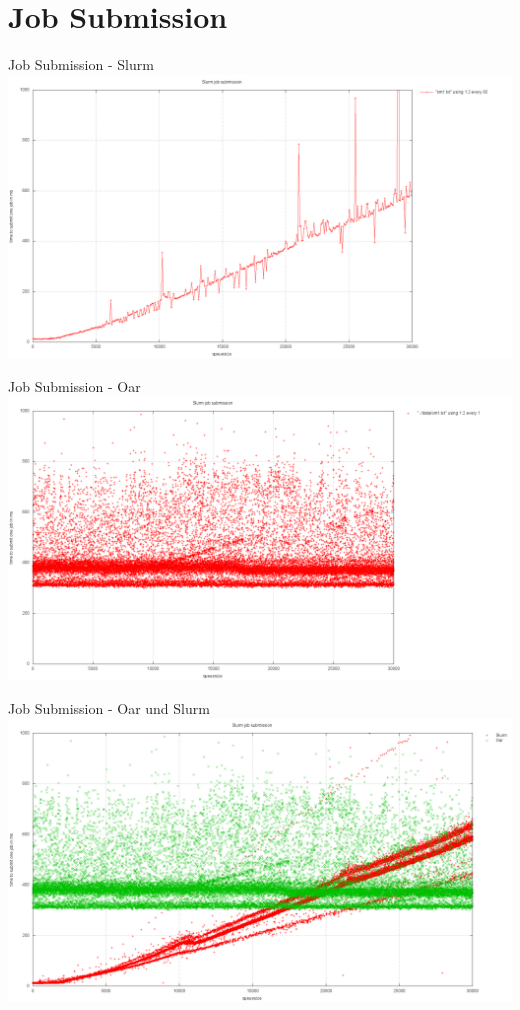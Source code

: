 \documentclass[10pt,utf8]{beamer}
\begin{document}
\section{Job Submission}
\begin{frame}{Job Submission - Slurm}
	\includegraphics[scale=0.22, keepaspectratio]{../output/pics/slurm.png}
\end{frame}

\begin{frame}{Job Submission - Oar}
	\includegraphics[scale=0.22, keepaspectratio]{../output/pics/oar.png}
\end{frame}

\begin{frame}{Job Submission - Oar und Slurm}
	\includegraphics[scale=0.22, keepaspectratio]{../output/pics/oar_slurm.png}
\end{frame}
\end{document}
